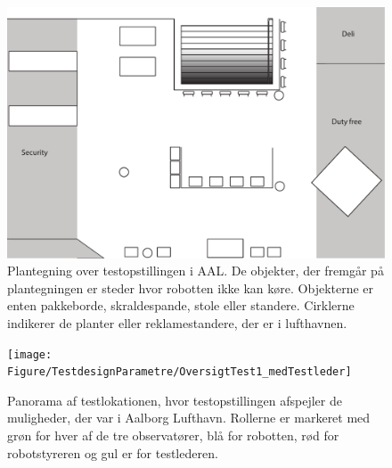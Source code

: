 \newpage   
%
\begin{figure}[H]
\centering
\includegraphics[width =\textwidth]{Figure/TestdesignParametre/Overview_airport} 
\caption{Plantegning over testopstillingen i AAL. De objekter, der fremgår på plantegningen er steder hvor robotten ikke kan køre. Objekterne er enten pakkeborde, skraldespande, stole eller standere. Cirklerne indikerer de planter eller reklamestandere, der er i lufthavnen.}
\label{fig:ParametrePlantegningTestopstilling}
\end{figure}
\noindent
% 
%
\begin{figure}[H]
\centering
\texttt{[image: Figure/TestdesignParametre/OversigtTest1\_medTestleder]} 
\caption{Panorama af testlokationen, hvor testopstillingen afspejler de muligheder, der var i Aalborg Lufthavn. Rollerne er markeret med grøn for hver af de tre observatører, blå for robotten, rød for robotstyreren og gul er for testlederen.}
\label{fig:ParametreTestopstilling}
\end{figure}
\noindent
%  


